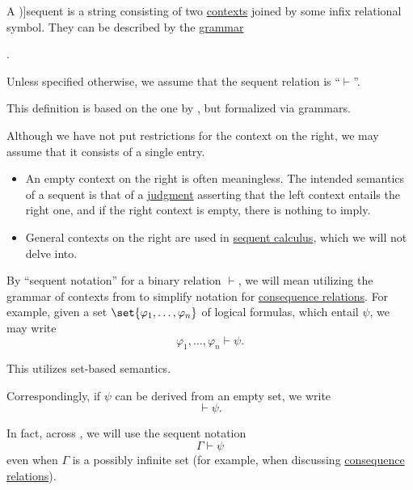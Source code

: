 \begin{definition}\label{def:sequent}\mimprovised
  A \term[ru=секвенция (\cite[49]{Герасимов2011Вычислимость})]{sequent} is a string consisting of two \hyperref[def:logical_context]{contexts} joined by some infix relational symbol. They can be described by the \hyperref[def:formal_grammar]{grammar}
  \begin{bnf*}
     { \bnfsp {} \bnfsp {}}.
  \end{bnf*}

  Unless specified otherwise, we assume that the sequent relation is \enquote{\( \vdash \)}.
\end{definition}
\begin{comments}
  \item This definition is based on the one by , but formalized via grammars.

  \item Although we have not put restrictions for the context on the right, we may assume that it consists of a single entry.
  \begin{itemize}
    \item An empty context on the right is often meaningless. The intended semantics of a sequent is that of a \hyperref[con:judgment]{judgment} asserting that the left context entails the right one, and if the right context is empty, there is nothing to imply.

    \item General contexts on the right are used in \hyperref[rem:sequent_calculus]{sequent calculus}, which we will not delve into.
  \end{itemize}
\end{comments}

\begin{remark}\label{rem:sequent_notation}
  By \enquote{sequent notation} for a binary relation \( \vdash \), we will mean utilizing the grammar of contexts from  to simplify notation for \hyperref[def:consequence_relation]{consequence relations}. For example, given a set \( \set{ \varphi_1, \ldots, \varphi_n } \) of logical formulas, which entail \( \psi \), we may write
  \begin{equation*}
    \varphi_1, \ldots, \varphi_n \vdash \psi.
  \end{equation*}

  This utilizes set-based semantics.

  Correspondingly, if \( \psi \) can be derived from an empty set, we write
  \begin{equation*}
    \vdash \psi.
  \end{equation*}

  In fact, across , we will use the sequent notation
  \begin{equation*}
    \Gamma \vdash \psi
  \end{equation*}
  even when \( \Gamma \) is a possibly infinite set (for example, when discussing \hyperref[def:consequence_relation]{consequence relations}).
\end{remark}

